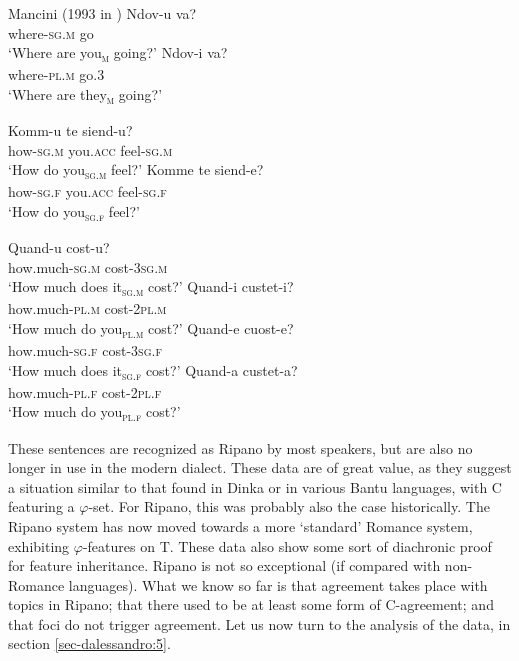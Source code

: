 \documentclass[output=paper
,modfonts
,nonflat]{langsci/langscibook}
\begin{document}
\begin{exe} 
	\ex Mancini (1993 in \citealt[4]{Ledgeway2006}) \xlist
	\ex 
	\gll Ndov-u   va?\\
	where-\textsc{sg.m} go\\
	\glt`Where are you\textsc{\textsubscript{m}} going?'
	\ex
	\gll   Ndov-i     va?\\
	where-\textsc{pl.m} go.3\\ 
	\glt `Where are they\textsc{\textsubscript{m}} going?'
	\endxlist
\end{exe}
\begin{exe} 
	\ex  \xlist
	\ex 
	\gll Komm-u   te     siend-u?\\
	how-\textsc{sg.m} you.\textsc{acc} feel-\textsc{sg.m}\\
	\glt `How do you\textsc{\textsubscript{sg.m}} feel?'
	\ex
	\gll Komme   te     siend-e? \\
	how-\textsc{sg.f} you.\textsc{acc} feel-\textsc{sg.f}\\ 
	\glt `How do you\textsc{\textsubscript{sg.f}} feel?'
	\endxlist
\end{exe}
\begin{exe} 
	\ex \citet[54]{Lambertelli2003} \xlist
	\ex 
	\gll Quand-u   cost-u?\\
	how.much-\textsc{sg.m}  cost-\textsc{3sg.m}\\
	\glt `How much does it\textsc{\textsubscript{sg.m}} cost?'
	\ex
	\gll Quand-i   custet-i? \\
	how.much-\textsc{pl.m}  cost-\textsc{2pl.m}\\ 
	\glt `How much do you\textsc{\textsubscript{pl.m}} cost?'
	\ex
	\gll Quand-e   cuost-e? \\
	how.much-\textsc{sg.f}  cost-\textsc{3sg.f}\\ 
	\glt `How much does it\textsc{\textsubscript{sg.f}} cost?'
	\ex
	\gll Quand-a   custet-a? \\
	how.much-\textsc{pl.f}  cost-\textsc{2pl.f}\\ 
	\glt `How much do you\textsc{\textsubscript{pl.f}} cost?'
	\endxlist
\end{exe}
\noindent These sentences are recognized as Ripano by most speakers, but are also no longer in use in the modern dialect. 
These data are of great value, as they suggest a situation similar to that found in Dinka or in various Bantu languages, with C featuring a $\varphi $-set. For Ripano, this was probably also the case historically. The Ripano system has now moved towards a more ‘standard’ Romance system, exhibiting $\varphi $-features on T.
These data also show some sort of diachronic proof for feature inheritance. Ripano is not so exceptional (if compared with non-Romance languages).
What we know so far is that agreement takes place with topics in Ripano; that there used to be at least some form of C-agreement; and that foci do not trigger agreement.
Let us now turn to the analysis of the data, in section \ref{sec-dalessandro:5}.
\end{document}
